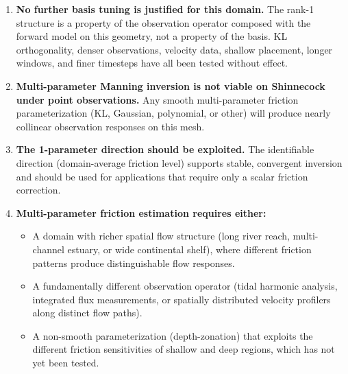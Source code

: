 \documentclass[11pt]{article}
\theoremstyle{definition}
\begin{document}
\begin{enumerate}
\item \textbf{No further basis tuning is justified for this domain.}
  The rank-1 structure is a property of the observation operator
  composed with the forward model on this geometry, not a property
  of the basis.  KL orthogonality, denser observations, velocity
  data, shallow placement, longer windows, and finer timesteps have
  all been tested without effect.

\item \textbf{Multi-parameter Manning inversion is not viable on
  Shinnecock under point observations.}
  Any smooth multi-parameter friction parameterization (KL, Gaussian,
  polynomial, or other) will produce nearly collinear observation
  responses on this mesh.

\item \textbf{The 1-parameter direction should be exploited.}
  The identifiable direction (domain-average friction level) supports
  stable, convergent inversion and should be used for applications
  that require only a scalar friction correction.

\item \textbf{Multi-parameter friction estimation requires either:}
  \begin{itemize}
  \item A domain with richer spatial flow structure (long river
    reach, multi-channel estuary, or wide continental shelf),
    where different friction patterns produce distinguishable
    flow responses.
  \item A fundamentally different observation operator (tidal
    harmonic analysis, integrated flux measurements, or spatially
    distributed velocity profilers along distinct flow paths).
  \item A non-smooth parameterization (depth-zonation) that
    exploits the different friction sensitivities of shallow and
    deep regions, which has not yet been tested.
  \end{itemize}
\end{enumerate}
\end{document}
